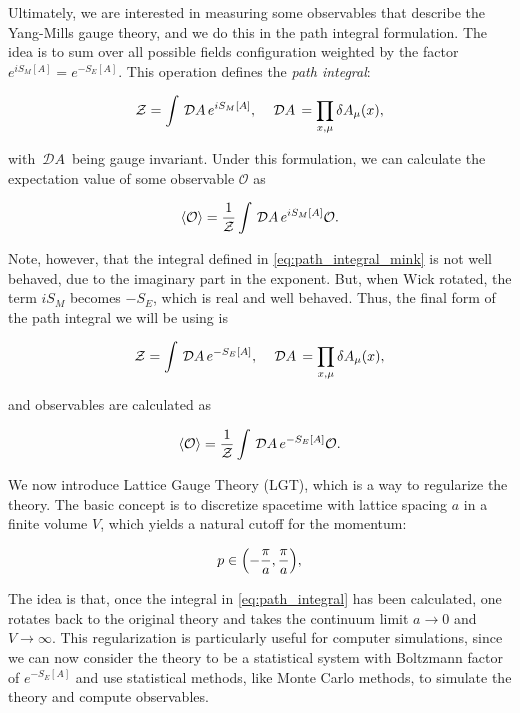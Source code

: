 \documentclass[reqno,12pt]{article}
\numberwithin{equation}{section}
\newcommand{\D}[1]{\,\mathcal{D}#1\,}
\newcommand{\Z}{\mathcal{Z}}
\begin{document}
Ultimately, we are interested in measuring some observables that describe the Yang-Mills gauge theory, and we
do this in the path integral formulation. The idea is to
sum over all possible fields configuration weighted by the factor $e^{iS_M[A]} = e^{-S_E[A]}$.
This operation defines the \textit{path integral}:

\begin{equation} \label{eq:path_integral_mink}
	\Z = \int \D{A} e^{iS_M[A]} \qc \D{A} = \prod_{x, \mu} \delta A_\mu(x),
\end{equation}

with $\D{A}$ being gauge invariant. 
Under this formulation, we can calculate the expectation value of
some observable $\mathcal{O}$ as 

\begin{equation}
	\expval{\mathcal{O}} = \frac{1}{\Z} \int \D{A} e^{iS_M[A]} \mathcal{O}.
\end{equation}

Note, however, that the integral defined in \eqref{eq:path_integral_mink} is not well behaved, due to the imaginary part in the
exponent. But, when Wick rotated, the term $iS_M$ becomes $-S_E$, which is real and well behaved. Thus, the final form of the
path integral we will be using is

\begin{equation} \label{eq:path_integral}
	\Z = \int \D{A} e^{-S_E[A]} \qc \D{A} = \prod_{x, \mu} \delta A_\mu(x),
\end{equation}

and observables are calculated as

\begin{equation} \label{eq:obs_expval}
	\expval{\mathcal{O}} = \frac{1}{\Z} \int \D{A} e^{-S_E[A]} \mathcal{O}.
\end{equation}

We now introduce Lattice Gauge Theory (LGT), which is a way to regularize the theory. The basic concept
is to discretize spacetime with lattice spacing $a$ in a finite volume $V$, which yields a natural cutoff for the momentum:

\begin{equation}
	p \in \qty(-\frac{\pi}{a}, \frac{\pi}{a}),
\end{equation}

The idea is that, once the integral in \eqref{eq:path_integral} has been calculated, one rotates back to the original
theory and takes the continuum limit $a \rightarrow 0$ and $V \rightarrow \infty$. This regularization is particularly useful
for computer simulations, since we can now consider the theory to be a statistical system with Boltzmann factor of $e^{-S_E[A]}$
and use statistical methods, like Monte Carlo methods, to simulate the theory and compute observables. 
\end{document}
